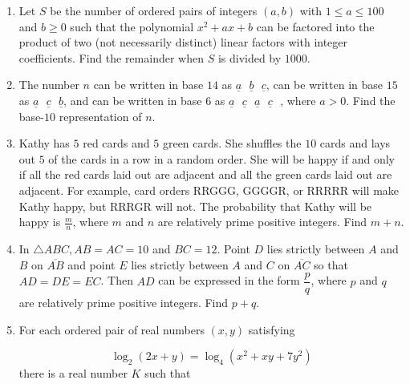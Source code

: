 \documentclass{article}
\begin{document}
\begin{enumerate}[label=\arabic*., itemsep=0.5em]\item Let \(S\) be the number of ordered pairs of integers \((a,b)\) with \(1 \leq a \leq 100\) and \(b \geq 0\) such that the polynomial \(x^2+ax+b\) can be factored into the product of two (not necessarily distinct) linear factors with integer coefficients. Find the remainder when \(S\) is divided by \(1000\).\par \vspace{0.5em}\item The number \(n\) can be written in base \(14\) as \(\underline{a}\text{ }\underline{b}\text{ }\underline{c}\), can be written in base \(15\) as \(\underline{a}\text{ }\underline{c}\text{ }\underline{b}\), and can be written in base \(6\) as \(\underline{a}\text{ }\underline{c}\text{ }\underline{a}\text{ }\underline{c}\text{ }\), where \(a > 0\). Find the base-\(10\) representation of \(n\).\par \vspace{0.5em}\item Kathy has \(5\) red cards and \(5\) green cards. She shuffles the \(10\) cards and lays out \(5\) of the cards in a row in a random order. She will be happy if and only if all the red cards laid out are adjacent and all the green cards laid out are adjacent. For example, card orders RRGGG, GGGGR, or RRRRR will make Kathy happy, but RRRGR will not. The probability that Kathy will be happy is \( \frac{m}{n}\), where \(m\) and \(n\) are relatively prime positive integers. Find \(m + n\).\par \vspace{0.5em}\item In \(\triangle ABC, AB = AC = 10\) and \(BC = 12\). Point \(D\) lies strictly between \(A\) and \(B\) on \(\overline{AB}\) and point \(E\) lies strictly between \(A\) and \(C\) on \(\overline{AC}\) so that \(AD = DE = EC\). Then \(AD\) can be expressed in the form \(\dfrac{p}{q}\), where \(p\) and \(q\) are relatively prime positive integers. Find \(p+q\).\par \vspace{0.5em}\item For each ordered pair of real numbers \((x,y)\) satisfying

\begin{equation*}
\log_2(2x+y) = \log_4(x^2+xy+7y^2)
\end{equation*}
there is a real number \(K\) such that


\end{enumerate}
\end{document}
